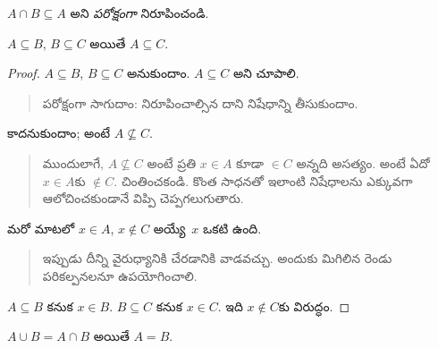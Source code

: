 \documentclass[../../../include/open-logic-section]{subfiles}
\begin{document}
\begin{prob}
$A \cap B \subseteq A$ అని \emph{పరోక్షంగా} నిరూపించండి.
\end{prob}

\begin{prop}
$A \subseteq B$, $B \subseteq C$ అయితే $A \subseteq C$.
\end{prop}

\begin{proof}
  $A \subseteq B$, $B \subseteq C$ అనుకుందాం. $A
  \subseteq C$ అని చూపాలి.
  \begin{quote}
    పరోక్షంగా సాగుదాం: నిరూపించాల్సిన దాని నిషేధాన్ని తీసుకుందాం.
  \end{quote}
  కాదనుకుందాం; అంటే $A \nsubseteq C$.
  \begin{quote}
    ముందులాగే, $A \nsubseteq C$ అంటే ప్రతి $x \in A$ కూడా
    $\in C$ అన్నది అసత్యం. అంటే ఏదో $x \in A$కు $\notin C$.
    చింతించకండి. కొంత సాధనతో ఇలాంటి నిషేధాలను ఎక్కువగా
    ఆలోచించకుండానే విప్పి చెప్పగలుగుతారు.
  \end{quote}
  మరో మాటలో $x \in A$, $x \notin C$ అయ్యే~$x$ ఒకటి ఉంది.
  \begin{quote}
    ఇప్పుడు దీన్ని వైరుధ్యానికి చేరడానికి వాడవచ్చు. అందుకు మిగిలిన రెండు పరికల్పనలనూ ఉపయోగించాలి.
  \end{quote}
  $A \subseteq B$ కనుక $x \in B$. $B \subseteq C$ కనుక $x \in
  C$. ఇది $x \notin C$కు విరుద్ధం.
\end{proof}

\begin{prop}
$A \cup B = A \cap B$ అయితే $A = B$.
\end{prop}
\end{document}
